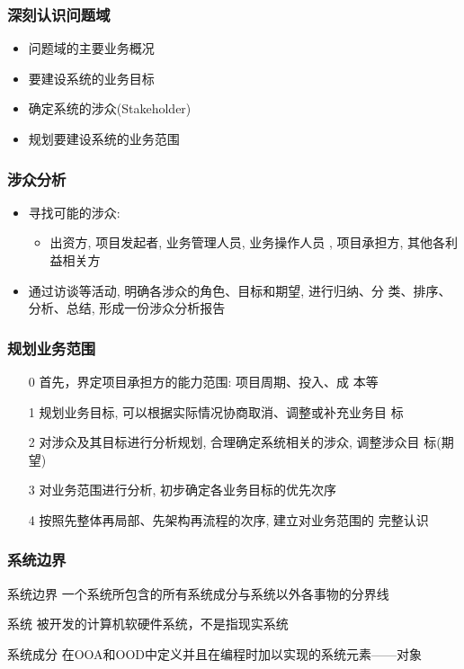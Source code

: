 \documentclass[compress]{beamer}
\begin{document}
\begin{frame}
    \frametitle{深刻认识问题域}
    \begin{itemize}
        \item 问题域的主要业务概况
        \item 要建设系统的业务目标
        \item 确定系统的涉众(Stakeholder)
        \item 规划要建设系统的业务范围
    \end{itemize}
\end{frame}

\begin{frame}
    \frametitle{涉众分析}
    \begin{itemize}
        \item 寻找可能的涉众: 
            \begin{itemize}
                \item 出资方, 项目发起者, 业务管理人员, 业务操作人员
            , 项目承担方, 其他各利益相关方
             \end{itemize}
        \item 通过访谈等活动, 明确各涉众的角色、目标和期望, 进行归纳、分
            类、排序、分析、总结, 形成一份涉众分析报告
    \end{itemize}
\end{frame}

\begin{frame}
    \frametitle{规划业务范围}
    \begin{enumerate}
        \item[0] 首先，界定项目承担方的能力范围: 项目周期、投入、成
            本等
        \item[1]  规划业务目标, 可以根据实际情况协商取消、调整或补充业务目
            标
        \item[2] 对涉众及其目标进行分析规划, 合理确定系统相关的涉众, 调整涉众目
            标(期望)
        \item[3] 对业务范围进行分析, 初步确定各业务目标的优先次序
        \item[4] 按照先整体再局部、先架构再流程的次序, 建立对业务范围的
            完整认识
    \end{enumerate}
\end{frame}

\begin{frame}
  \frametitle{系统边界}
  \begin{block}{系统边界}
    一个系统所包含的所有系统成分与系统以外各事物的分界线
  \end{block}
  \begin{block}{系统}
    被开发的计算机软硬件系统，不是指现实系统
  \end{block}
  \begin{block}{系统成分}
    在OOA和OOD中定义并且在编程时加以实现的系统元素——对象
  \end{block}

\end{frame}
\end{document}
